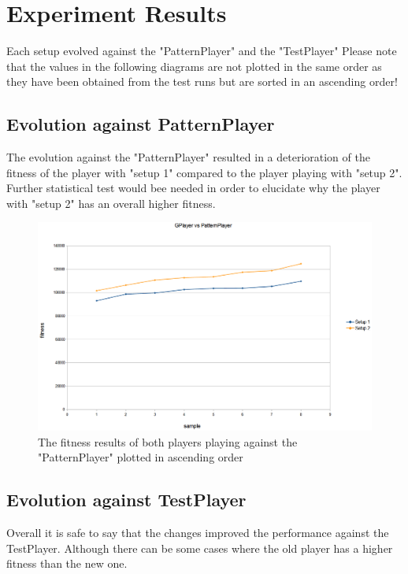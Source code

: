 \documentclass[12pt,fleqn,a4paper]{article}
\begin{document}
\section{Experiment Results}
\label{sec:expres}
Each setup evolved against the "PatternPlayer" and the "TestPlayer"  
Please note that the values in the following diagrams are not plotted in the same order as they have been obtained from the test runs but are sorted in an ascending order!\\

\subsection{Evolution against PatternPlayer}
The evolution against the "PatternPlayer" resulted in a deterioration of the fitness of the player with "setup 1" compared to the player playing with "setup 2".\\
Further statistical test would bee needed in order to elucidate why the player with "setup 2" has an overall higher fitness.

\begin{figure}[!h]
	\begin{center}
	\includegraphics[width=.7\textwidth]{gp_vs_pp_new.png}
	\caption{The fitness results of both players playing against the "PatternPlayer" plotted in ascending order}
	\end{center}
\end{figure}

\newpage
\subsection{Evolution against TestPlayer}
Overall it is safe to say that the changes improved the performance against the TestPlayer. Although there can be some cases where the old player has a higher fitness than the new one.
\end{document}
